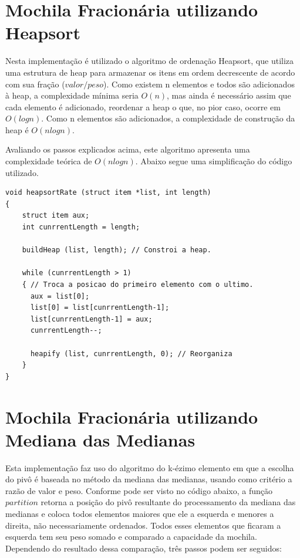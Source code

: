 \documentclass[
	12pt,				%
	oneside,			%
	a4paper,			%
	english,			%
	french,				%
	spanish,			%
	brazil,				%
	]{abntex2}
\begin{document}
\section{Mochila Fracionária utilizando Heapsort}

Nesta implementação é utilizado o algoritmo de ordenação Heapsort, que utiliza uma estrutura de heap para armazenar os itens em ordem decrescente de acordo com sua fração ($valor/peso$). Como existem n elementos e todos são adicionados à heap, a complexidade mínima seria $O(n)$, mas ainda é necessário assim que cada elemento é adicionado, reordenar a heap o que, no pior caso, ocorre em $O(logn)$. Como n elementos são adicionados, a complexidade de construção da heap é $O(nlogn)$.

Avaliando os passos explicados acima, este algoritmo apresenta uma complexidade teórica de $O(nlogn)$. Abaixo segue uma simplificação do código utilizado.

\begin{lstlisting}[mathescape=true, label=heapsort]
void heapsortRate (struct item *list, int length)
{
    struct item aux;
    int cunrrentLength = length;

    buildHeap (list, length); // Constroi a heap.
  
    while (cunrrentLength > 1)
    { // Troca a posicao do primeiro elemento com o ultimo.
      aux = list[0]; 
      list[0] = list[cunrrentLength-1];
      list[cunrrentLength-1] = aux;
      cunrrentLength--;
    
      heapify (list, cunrrentLength, 0); // Reorganiza
    }
}
\end{lstlisting}


\section{Mochila Fracionária utilizando Mediana das Medianas}

Esta implementação faz uso do algoritmo do k-ézimo elemento em que a escolha do pivô é baseada no método da mediana das medianas, usando como critério a razão de valor e peso. Conforme pode ser visto no código abaixo, a função $partition$ retorna a posição do pivô resultante do processamento da mediana das medianas e coloca todos elementos maiores que ele a esquerda e menores a direita, não necessariamente ordenados. Todos esses elementos que ficaram a esquerda tem seu peso somado e comparado a capacidade da mochila. Dependendo do resultado dessa comparação, três passos podem ser seguidos:
\end{document}
